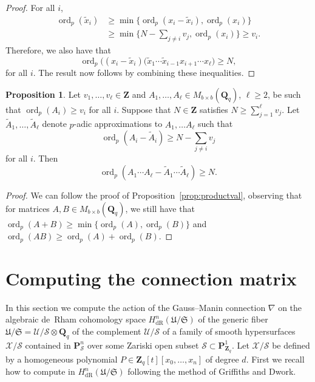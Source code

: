\documentclass[a4paper,11pt]{article}
\numberwithin{equation}{section}
\newcommand{\ZZ}{\mathbf{Z}} %
\newcommand{\QQ}{\mathbf{Q}} %
\DeclareMathOperator{\ord}{ord}          %
\providecommand{\HdR}{H_{\text{dR}}}    %
\theoremstyle{definition}
\newtheorem{prop}[thm]{Proposition}
\begin{document}
\begin{proof}
For all $i$,
\begin{align*}
\ord_p(\tilde{x}_i) &\geq \min \{ \ord_p(x_i-\tilde{x}_i), \ord_p(x_i) \} \\
                    &\geq \min \{ N- \sum_{j \neq i} v_j, \ord_p(x_i)\} \geq v_i.
\end{align*}
Therefore, we also have that
\begin{equation*}
\ord_p \bigl( (x_{i}-\tilde{x}_{i})
    (\tilde{x}_1 \dotsm \tilde{x}_{i-1} x_{i+1} \dotsm x_{\ell} \bigr) \geq N,
\end{equation*}
for all $i$. The result now follows by combining these inequalities.
\end{proof}

\begin{prop} \label{prop:matrixproductval}
Let $v_1,\dotsc,v_{\ell} \in \ZZ$ and 
$A_1, \dotsc, A_{\ell} \in M_{b \times b}(\QQ_q)$, $\ell \geq 2$, be 
such that $\ord_p(A_i) \geq v_i$ for all $i$. Suppose that $N \in \ZZ$ 
satisfies $N \geq \sum_{j=1}^{\ell} v_j$. 
Let $\tilde{A}_1, \dotsc, \tilde{A}_{\ell}$ denote $p$-adic approximations 
to $A_1, \dotsc A_{\ell}$ such that
\[
\ord_p(A_i - \tilde{A}_i) \geq N - \sum_{j \neq i} v_j
\]
for all $i$.  Then 
\begin{equation}
\ord_p(A_1 \dotsm A_{\ell} - \tilde{A}_1 \dotsm \tilde{A}_{\ell}) \geq N.
\end{equation}
\end{prop}

\begin{proof}
We can follow the proof of Proposition~\ref{prop:productval}, 
observing that for matrices $A,B \in M_{b \times b}(\QQ_q)$, we still 
have that $\ord_p(A + B) \geq \min \{\ord_p(A), \ord_p(B)\}$ and 
$\ord_p(AB) \geq \ord_p(A)+\ord_p(B)$.
\end{proof}

\section{Computing the connection matrix}
\label{sec:Connection}

In this section we compute the action of the Gauss--Manin connection $\nabla$ 
on the algebraic de~Rham cohomology space $\HdR^{n}(\mathfrak{U}/\mathfrak{S})$ 
of the generic fiber 
$\mathfrak{U}/\mathfrak{S}=\mathcal{U}/\mathcal{S} \otimes \QQ_q$ of the 
complement $\mathcal{U}/\mathcal{S}$ of a family of smooth hypersurfaces 
$\mathcal{X}/\mathcal{S}$ contained in $\mathbf{P}^n_{\mathcal{S}}$ over
some Zariski open subset $\mathcal{S} \subset \mathbf{P}^1_{\ZZ_q}$. Let 
$\mathcal{X}/\mathcal{S}$ be defined by a homogeneous polynomial 
$P \in \ZZ_q[t][x_0,\dotsc,x_n]$ of degree $d$. First we recall how to 
compute in $\HdR^{n}(\mathfrak{U}/\mathfrak{S})$ following the method 
of Griffiths and Dwork.  
\end{document}
